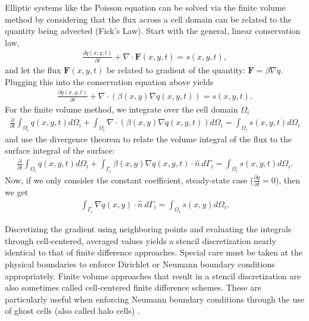 Elliptic systems like the Poisson equation can be solved via the finite volume method by considering that the flux across a cell domain can be related to the quantity being advected (Fick's Law). Start with the general, linear conservation law,
\begin{align}
    \frac{\partial q(x,y,t)}{\partial t} + \nabla \cdot \textbf{F}(x,y,t) = s(x,y,t),
\end{align}
and let the flux $\textbf{F}(x,y,t)$ be related to gradient of the quantity: $\textbf{F} = \beta \nabla q$. Plugging this into the conservation equation above yields
\begin{align}
    \frac{\partial q(x,y,t)}{\partial t} + \nabla \cdot \left( \beta(x,y) \nabla q(x,y,t) \right) = s(x,y,t).
\end{align}
For the finite volume method, we integrate over the cell domain $\Omega_i$
\begin{align}
    \frac{\partial}{\partial t} \int_{\Omega_i} q(x,y,t) d\Omega_i + \int_{\Omega_i} \nabla \cdot \left( \beta(x,y) \nabla q(x,y,t) \right) d\Omega_i = \int_{\Omega_i} s(x,y,t) d\Omega_i
\end{align}
and use the divergence theorem to relate the volume integral of the flux to the surface integral of the surface:
\begin{align}
    \frac{\partial}{\partial t} \int_{\Omega_i} q(x,y,t) d\Omega_i + \int_{\Gamma_i} \beta(x,y) \nabla q(x,y,t) \cdot \hat{n}\ d\Gamma_i = \int_{\Omega_i} s(x,y,t) d\Omega_i.
\end{align}
Now, if we only consider the constant coefficient, steady-state case ($\frac{\partial q}{\partial t} = 0$), then we get
\begin{align}
    \int_{\Gamma_i} \nabla q(x,y) \cdot \hat{n}\ d\Gamma_i = \int_{\Omega_i} s(x,y) d\Omega_i.
\end{align}

Discretizing the gradient using neighboring points and evaluating the integrals through cell-centered, averaged values yields a stencil discretization nearly identical to that of finite difference approaches. Special care must be taken at the physical boundaries to enforce Dirichlet or Neumann boundary conditions appropriately. Finite volume approaches that result in a stencil discretization are also sometimes called cell-centered finite difference schemes. These are particularly useful when enforcing Neumann boundary conditions through the use of ghost cells (also called halo cells) \citep{leveque2007finite}.

